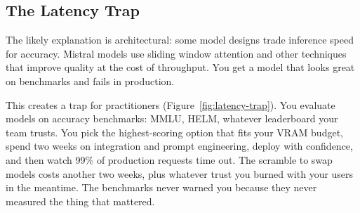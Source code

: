 \documentclass[11pt]{article}
\begin{document}
\subsection{The Latency Trap}
The likely explanation is architectural: some model designs trade inference speed for accuracy.
Mistral models use sliding window attention and other techniques that improve quality at the cost of throughput.
You get a model that looks great on benchmarks and fails in production.

This creates a trap for practitioners (Figure~\ref{fig:latency-trap}).
You evaluate models on accuracy benchmarks: MMLU, HELM, whatever leaderboard your team trusts.
You pick the highest-scoring option that fits your VRAM budget, spend two weeks on integration and prompt engineering, deploy with confidence, and then watch 99\% of production requests time out.
The scramble to swap models costs another two weeks, plus whatever trust you burned with your users in the meantime.
The benchmarks never warned you because they never measured the thing that mattered.
\end{document}
